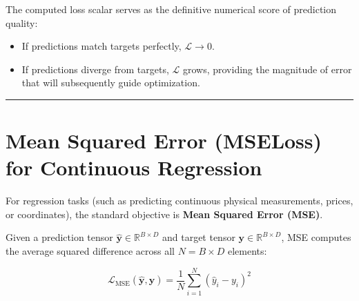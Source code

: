 \documentclass[
  letterpaper,
]{scrbook}
\providecommand{\tightlist}{%
  \setlength{\itemsep}{0pt}\setlength{\parskip}{0pt}}
\begin{document}
The computed loss scalar serves as the definitive numerical score of
prediction quality:

\begin{itemize}
\tightlist
\item
  If predictions match targets perfectly, \(\mathcal{L} \to 0\).
\item
  If predictions diverge from targets, \(\mathcal{L}\) grows, providing
  the magnitude of error that will subsequently guide optimization.
\end{itemize}

\begin{center}\rule{0.5\linewidth}{0.5pt}\end{center}

\section{Mean Squared Error (MSELoss) for Continuous
Regression}\label{mean-squared-error-mseloss-for-continuous-regression}

For regression tasks (such as predicting continuous physical
measurements, prices, or coordinates), the standard objective is
\textbf{Mean Squared Error (MSE)}.

Given a prediction tensor
\(\hat{\mathbf{y}} \in \mathbb{R}^{B \times D}\) and target tensor
\(\mathbf{y} \in \mathbb{R}^{B \times D}\), MSE computes the average
squared difference across all \(N = B \times D\) elements:

\[\mathcal{L}_{\text{MSE}}(\hat{\mathbf{y}}, \mathbf{y}) = \frac{1}{N} \sum_{i=1}^N (\hat{y}_i - y_i)^2\]
\end{document}
